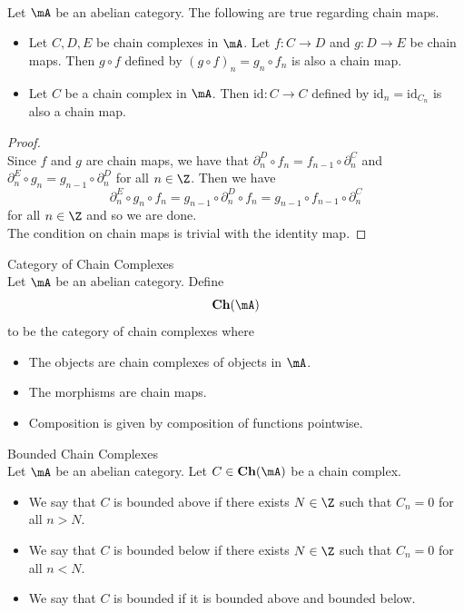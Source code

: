 \documentclass[a4paper]{article}
\begin{document}
\begin{lmm}{}{}\\
Let $\mA$ be an abelian category. The following are true regarding chain maps. 
\begin{itemize}
\item Let $C,D,E$ be chain complexes in $\mA$. Let $f:C\to D$ and $g:D\to E$ be chain maps. Then $g\circ f$ defined by $(g\circ f)_n=g_n\circ f_n$ is also a chain map. 
\item Let $C$ be a chain complex in $\mA$. Then $\text{id}:C\to C$ defined by $\text{id}_n=\text{id}_{C_n}$ is also a chain map. 
\end{itemize}
\begin{proof}\\
Since $f$ and $g$ are chain maps, we have that $\partial_n^D\circ f_n=f_{n-1}\circ\partial_n^C$ and $\partial_n^E\circ g_n=g_{n-1}\circ\partial_n^D$ for all $n\in\Z$. Then we have $$\partial_n^E\circ g_n\circ f_n=g_{n-1}\circ\partial_n^D\circ f_n=g_{n-1}\circ f_{n-1}\circ\partial_n^C$$ for all $n\in\Z$ and so we are done. \\

The condition on chain maps is trivial with the identity map. 
\end{proof}
\end{lmm}

\begin{defn}{Category of Chain Complexes}{}\\
Let $\mA$ be an abelian category. Define $$\bold{Ch}(\mA)$$ to be the category of chain complexes where 
\begin{itemize}
\item The objects are chain complexes of objects in $\mA$. 
\item The morphisms are chain maps. 
\item Composition is given by composition of functions pointwise. 
\end{itemize}
\end{defn}

\begin{defn}{Bounded Chain Complexes}{}\\
Let $\mA$ be an abelian category. Let $C\in\bold{Ch}(\mA)$ be a chain complex. 
\begin{itemize}
\item We say that $C$ is bounded above if there exists $N\in\Z$ such that $C_n=0$ for all $n>N$. 
\item We say that $C$ is bounded below if there exists $N\in\Z$ such that $C_n=0$ for all $n<N$. 
\item We say that $C$ is bounded if it is bounded above and bounded below. 
\end{itemize}
\end{defn}
\end{document}
